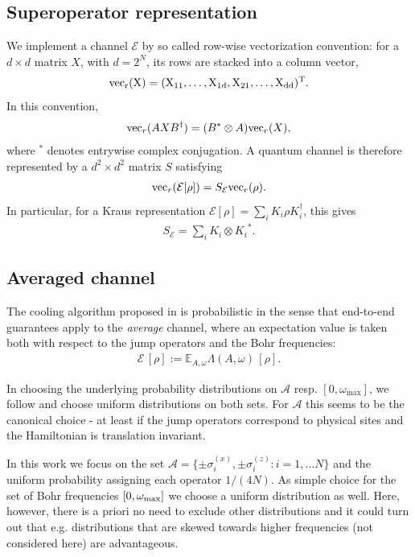 \documentclass[12pt,a4paper]{article}
\begin{document}
\subsection{Superoperator representation}
We implement a channel $\mathcal{E}$ by so called row-wise vectorization convention: for a
$d\times d$ matrix $X$, with $d=2^N$, its rows are stacked into a column vector,
\begin{align}
    \rm{vec}_r(X)
    = (X_{11},\ldots,X_{1d},X_{21},\ldots,X_{dd})^T.
\end{align}
In this convention,
\begin{align}
    {\rm vec}_r(AXB^{\dagger})
    = (B^*\otimes A){\rm vec}_r(X), 
\end{align}
where ${}^*$ denotes entrywise complex conjugation.
A quantum channel is therefore represented by a $d^2\times d^2$
matrix $S$ satisfying
\begin{align}
    {\rm vec}_r(\mathcal{E}[\rho])
    = S_{\mathcal{E}} {\rm vec}_r(\rho).
\end{align}
In particular, for a Kraus representation $\mathcal{E}[\rho]=\sum_i K_i\rho K_i^\dagger$,
this gives
\begin{align}
    S_{\mathcal{E}}=\sum_i K_i\otimes{K_i}^*.
\end{align}


\subsection{Averaged channel}
The cooling algorithm proposed in \citet{ding2025} is probabilistic in the sense that end-to-end guarantees apply to the \emph{average} channel, where an expectation value is taken both with respect to the jump operators and the Bohr frequencies:
\begin{align}\label{eq:avg_channel}
    \mathcal{E}\,[\rho]:= \mathbb{E}_{A, \omega} \Lambda(A,\omega)\,[\rho]. 
\end{align}

In choosing the underlying probability distributions on $\mathcal{A}$ resp. $[0,\omega_{\max}]$, we follow \citet{ding2025} and choose uniform distributions on both sets. %
For $\mathcal{A}$ this seems to be the canonical choice - at least if the jump operators correspond to physical sites and the Hamiltonian is translation invariant. 

In this work we focus on the set $\mathcal{A}=\{\pm \sigma_i^{(x)}, \pm \sigma_i^{(z)}: i = 1,\ldots N\}$ and the uniform probability assigning each operator ${1}/({4N})$.
As simple choice for the set of Bohr frequencies $[0,\omega_{\rm max}]$ we choose a uniform distribution as well. Here, however, there is a priori no need to exclude other distributions and it could turn out that e.g. distributions 
that are skewed towards higher frequencies (not considered here) are advantageous. %
\end{document}
